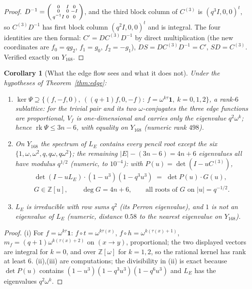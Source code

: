 \documentclass[11pt]{amsart}
\numberwithin{equation}{section}
\newtheorem{corollary}[theorem]{Corollary}
\theoremstyle{definition}
\theoremstyle{remark}
\newcommand{\Z}{\mathbb{Z}}
\newcommand{\rk}{\operatorname{rk}}
\newcommand{\Cthree}{C^{(3)}}
\newcommand{\LE}{L_{E}}
\begin{document}
\begin{proof}
$D^{-1}=\begin{psmallmatrix}0&I&0\\0&0&-I\\ q^{-1}I&0&0\end{psmallmatrix}$, and the third block
column of $\Cthree$ is $(q^{3}I,0,0)^{t}$, so $\Cthree D^{-1}$ has first block column
$(q^{2}I,0,0)^{t}$ and is integral. The four identities are then formal:
$C'=D\Cthree D^{-1}$ by direct multiplication (the new coordinates are $f_0=qg_2$, $f_1=g_0$,
$f_2=-g_1$), $DS=D\Cthree D^{-1}=C'$, $SD=\Cthree$. Verified exactly on $Y_{168}$.
\end{proof}

\begin{corollary}[What the edge flow sees and what it does not]\label{cor:spectrum}
Under the hypotheses of Theorem~\ref{thm:edge}:
\begin{enumerate}
\item[(i)] $\ker\Psi\supseteq\{(f,-f,0),\ ((q+1)f,0,-f):\ f=\omega^{k\tau}\mathbf1,\ k=0,1,2\}$,
a rank-$6$ sublattice: for the trivial pair and its two $\omega$-conjugates the three edge
functions are proportional, $V_f$ is one-dimensional and carries only the eigenvalue
$q^{2}\omega^{k}$; hence $\rk\Psi\le3n-6$, with equality on $Y_{168}$ (numeric rank $498$).
\item[(ii)] On $Y_{168}$ the spectrum of $\LE$ contains every pencil root except the six
$\{1,\omega,\omega^{2},q,q\omega,q\omega^{2}\}$; the remaining $|E|-(3n-6)=4n+6$ eigenvalues
all have modulus $q^{1/2}$ (numeric, to $10^{-4}$): with $P(u)=\det(I-u\Cthree)$,
\begin{gather*}
\det(I-u\LE)\cdot(1-u^{3})(1-q^{3}u^{3})\;=\;\det P(u)\cdot G(u),\\
G\in\Z[u],\qquad \deg G=4n+6,\qquad \text{all roots of $G$ on }|u|=q^{-1/2}.
\end{gather*}
\item[(iii)] $\LE$ is irreducible with row sums $q^{2}$ (its Perron eigenvalue), and $1$ is
not an eigenvalue of $\LE$ (numeric, distance $0.58$ to the nearest eigenvalue on $Y_{168}$).
\end{enumerate}
\end{corollary}

\begin{proof}
(i) For $f=\omega^{k\tau}\mathbf1$: $f\circ t=\omega^{k\tau(x)}$, $f\circ h=\omega^{k(\tau(x)+1)}$,
$m_f=(q+1)\omega^{k(\tau(x)+2)}$ on $(x\to y)$, proportional; the two displayed vectors are
integral for $k=0$, and over $\Z[\omega]$ for $k=1,2$, so the rational kernel has rank at
least $6$. (ii),(iii) are computations; the divisibility in (ii) is exact because
$\det P(u)$ contains $(1-u^{3})(1-q^{3}u^{3})(1-q^{6}u^{3})$ and $\LE$ has the eigenvalues
$q^{2}\omega^{k}$.
\end{proof}
\end{document}
